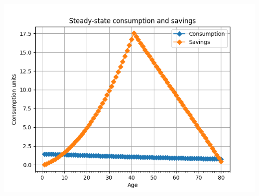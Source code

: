 \documentclass[letterpaper,12pt]{article}
\theoremstyle{definition}
\begin{document}
\begin{center}
\includegraphics[scale=0.7]{ss_bc2}
\end{center}
\end{document}
